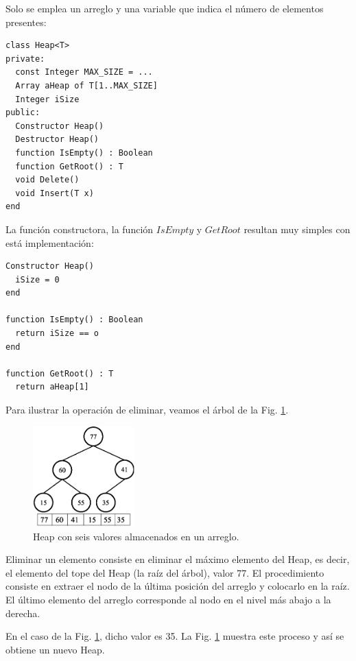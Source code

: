 Solo se emplea un arreglo y una variable que indica el número de elementos presentes:
\begin{lstlisting}[upquote=true, language=pseudo]
class Heap<T>
private: 
  const Integer MAX_SIZE = ...
  Array aHeap of T[1..MAX_SIZE]
  Integer iSize
public:
  Constructor Heap()
  Destructor Heap()
  function IsEmpty() : Boolean
  function GetRoot() : T
  void Delete()
  void Insert(T x)
end
\end{lstlisting}

La función constructora, la función $IsEmpty$ y $GetRoot$ resultan muy simples con está implementación:

\begin{lstlisting}[upquote=true, language=pseudo]
Constructor Heap()
  iSize = 0
end

function IsEmpty() : Boolean
  return iSize == o
end

function GetRoot() : T
  return aHeap[1]
\end{lstlisting}

Para ilustrar la operación de eliminar, veamos el árbol de la Fig. \ref{fig:heaptree}.

\begin{figure}[htpb!]
  \begin{center}
    \includegraphics[width=0.35\textwidth]{images/heaptree.eps}
  \end{center}
  \caption{Heap con seis valores almacenados en un arreglo.}
  \label{fig:heaptree}
\end{figure}

Eliminar un elemento consiste en eliminar el máximo elemento del Heap, es decir, el elemento del tope del Heap (la raíz del árbol), valor 77. El procedimiento consiste en extraer el nodo de la última posición del arreglo y colocarlo en la raíz. El último elemento del arreglo corresponde al nodo en el nivel más abajo a la derecha. 

En el caso de la Fig. \ref{fig:heaptree}, dicho valor es 35. La Fig. \ref{fig:heaptree} muestra este proceso y así se obtiene un nuevo Heap.

